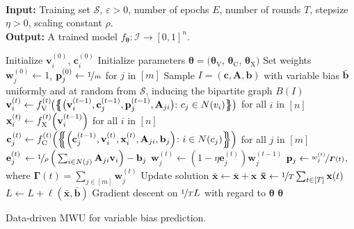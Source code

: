 \documentclass[6pt, DIV=12]{scrartcl}
\theoremstyle{definition}
\newcommand{\cI}{\ensuremath{{\mathcal I}}\xspace}
\newcommand{\cS}{\ensuremath{{\mathcal S}}\xspace}
\renewcommand{\vec}[1]{\mathbf{#1}}
\begin{document}
\begin{algorithm}[H]\mbox{\hfill}
	\\\textbf{Input:}  Training set $\cS$, $\varepsilon > 0$, number of epochs $E$, number of rounds $T$, stepsize $\eta > 0$, scaling constant $\rho$.  \\
	\textbf{Output:} A trained model $f_{\boldsymbol{\theta}} \colon \cI \to [0,1]^n$.
	\begin{algorithmic}[1]
		\State Initialize $\vec{v}_i^{(0)}$, $\vec{c}_i^{(0)}$
		\State Initialize parameters $\boldsymbol{\theta} = (\boldsymbol{\theta}_{\text{V}}$, $\boldsymbol{\theta}_{\text{C}}$, $\boldsymbol{\theta}_{\text{X}})$
		\State Set weights $\vec{w}_j^{(0)} \leftarrow 1$, $\vec{p}_j^{(0)} \leftarrow \nicefrac{1}{m}$ for $j$ in $[m]$
		\State Sample $I = (\vec{c}, \vec{A}, \vec{b})$ with variable bias $\vec{\bar{b}}$ uniformly and at random from $\cS$, inducing the bipartite graph $B(I)$
		\State $\vec{v}_i^{(t)} \leftarrow {f}^{(t)}_{\text{V}} \hspace{-1pt} \big( \big\{ \hspace{-4.4pt} \big\{ \big( \vec{v}^{(t-1)}_i, \vec{c}^{(t-1)}_j, \vec{p}^{(t-1)}_j, \vec{A}_{ji} \big)\hspace{-1pt} \colon c_j \in N(v_i) \big\} \hspace{-4.4pt} \big\} \big)$ for all $i$ in $[n]$ 		
		\State $\vec{x}_i^{(t)} \leftarrow {f}^{(t)}_{\text{X}} \hspace{-2pt} \left(\vec{v}_i^{(t-1)} \right)$ for all $i$ in $[n]$ 
		\Statex
		\Statex
		\State $\vec{c}_j^{\hspace{1pt}(t)} \leftarrow {f}^{(t)}_{\text{C}} \hspace{-2pt} \left( \left\{ \hspace{-4.4pt} \left\{ \left( \vec{c}^{(t-1)}_j, \vec{v}^{(t)}_i, \vec{x}^{(t)}_i, \vec{A}_{ji}, \vec{b}_j \right)\hspace{-2pt} \colon i \in N(c_j) \right\} \hspace{-4.4pt} \right\} \right)$ for all $j$ in $[m]$ 		
		\State $\vec{e}_j^{(t)} \, \leftarrow \nicefrac{1}{\rho}\,\Big(\sum_{i \in N(j)} \label{key}\vec{A}_{ji}  \vec{v}_i \Big) - \vec{b}_j$
		\State $\vec{w}_j^{(t)} \leftarrow ( 1 -  \eta \vec{e}^{(t)}_j) \vec{w}_j^{(t-1)} $ 
		\State $\vec{p}_j \leftarrow \nicefrac{w_j^{(t)}}{\boldsymbol{\Gamma}(t)} $, where $\boldsymbol{\Gamma}(t) = \sum_{j \in [m]} \vec{w}^{(t)}_j$
		\State Update solution $\vec{\bar{x}} \leftarrow \vec{\bar{x}} + \vec{x}$
		\EndFor
		\State $\vec{\bar{x}} \leftarrow \nicefrac{1}{T} \sum_{t \in [T]} \vec{x}(t) $
		\State $L \leftarrow L + \ell(\vec{\bar{x}}, \vec{\bar b})$ 
		\State Gradient descent on $\nicefrac{1}{T} L$ with regard to $\boldsymbol{\theta}$
		\EndFor
		\State \Return $\boldsymbol{\theta}$
		
	\end{algorithmic}
	\caption{Data-driven MWU for variable bias prediction.}
	\label{alg:as2}
\end{algorithm}
\end{document}
